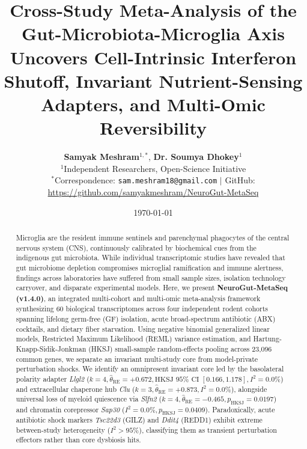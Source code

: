 \documentclass[10pt,a4paper]{article}
\title{\textbf{\Large Cross-Study Meta-Analysis of the Gut-Microbiota-Microglia Axis Uncovers Cell-Intrinsic Interferon Shutoff, Invariant Nutrient-Sensing Adapters, and Multi-Omic Reversibility}}
\author{
  \textbf{Samyak Meshram}$^{1,*}$, \textbf{Dr. Soumya Dhokey}$^{1}$ \\[0.4em]
  \small $^{1}$Independent Researchers, Open-Science Initiative \\
  \small $^*$Correspondence: \texttt{sam.meshram18@gmail.com} \quad $|$ \quad GitHub: \url{https://github.com/samyakmeshram/NeuroGut-MetaSeq}
}
\date{\small \today}
\begin{document}
\maketitle

\linenumbers

\begin{abstract}
Microglia are the resident immune sentinels and parenchymal phagocytes of the central nervous system (CNS), continuously calibrated by biochemical cues from the indigenous gut microbiota. While individual transcriptomic studies have revealed that gut microbiome depletion compromises microglial ramification and immune alertness, findings across laboratories have suffered from small sample sizes, isolation technology carryover, and disparate experimental models. Here, we present \textbf{NeuroGut-MetaSeq (v1.4.0)}, an integrated multi-cohort and multi-omic meta-analysis framework synthesizing 60 biological transcriptomes across four independent rodent cohorts spanning lifelong germ-free (GF) isolation, acute broad-spectrum antibiotic (ABX) cocktails, and dietary fiber starvation. Using negative binomial generalized linear models, Restricted Maximum Likelihood (REML) variance estimation, and Hartung-Knapp-Sidik-Jonkman (HKSJ) small-sample random-effects pooling across 23,096 common genes, we separate an invariant multi-study core from model-private perturbation shocks. We identify an omnipresent invariant core led by the basolateral polarity adapter \textit{Llgl2} ($k=4, \hat{\theta}_{\text{RE}} = +0.672, \text{HKSJ } 95\% \text{ CI } [0.166, 1.178], I^2 = 0.0\%$) and extracellular chaperone hub \textit{Clu} ($k=3, \hat{\theta}_{\text{RE}} = +0.873, I^2 = 0.0\%$), alongside universal loss of myeloid quiescence via \textit{Slfn2} ($k=4, \hat{\theta}_{\text{RE}} = -0.465, p_{\text{HKSJ}} = 0.0197$) and chromatin corepressor \textit{Sap30} ($I^2 = 0.0\%, p_{\text{HKSJ}} = 0.0409$). Paradoxically, acute antibiotic shock markers \textit{Tsc22d3} (GILZ) and \textit{Ddit4} (REDD1) exhibit extreme between-study heterogeneity ($I^2 > 95\%$), classifying them as transient perturbation effectors rather than core dysbiosis hits. 


\end{abstract}
\end{document}
